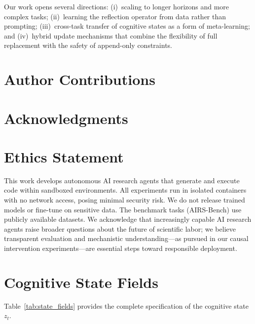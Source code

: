 \documentclass{article} %
\newcommand{\zt}{z_t}
\begin{document}

Our work opens several directions: (i)~scaling to longer horizons and more
complex tasks; (ii)~learning the reflection operator from data rather than
prompting; (iii)~cross-task transfer of cognitive states as a form of
meta-learning; and (iv)~hybrid update mechanisms that combine the flexibility
of full replacement with the safety of append-only constraints.


\section*{Author Contributions}

\section*{Acknowledgments}

\section*{Ethics Statement}
This work develops autonomous AI research agents that generate and execute code
within sandboxed environments. All experiments run in isolated containers with
no network access, posing minimal security risk. We do not release trained
models or fine-tune on sensitive data. The benchmark tasks (AIRS-Bench) use
publicly available datasets. We acknowledge that increasingly capable AI
research agents raise broader questions about the future of scientific labor;
we believe transparent evaluation and mechanistic understanding---as pursued in
our causal intervention experiments---are essential steps toward responsible
deployment.





\appendix

\section{Cognitive State Fields}
\label{sec:app_state}

Table~\ref{tab:state_fields} provides the complete specification of the
cognitive state $\zt$.
\end{document}
